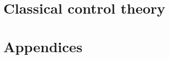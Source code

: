\documentclass[11pt]{book}
\begin{document}
\part{Classical control theory}
\label{part:classical_control_theory}
\renewcommand*{\partpath}{classical-control-theory}



\part{Appendices}
\renewcommand{\chaptermark}[1]{\markboth{\sffamily\normalsize\bfseries\appendixname\ \thechapter.\ #1}{}}
\appendix
\renewcommand*{\partpath}{appendices}







\renewcommand{\chaptermark}[1]{\markboth{\sffamily\normalsize\bfseries #1}{}}
\backmatter
{}




\end{document}
